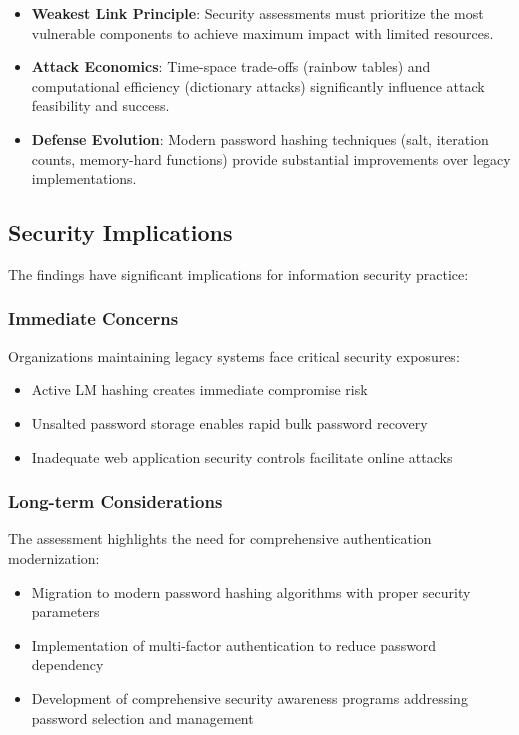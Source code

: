 \begin{itemize}
    \item \textbf{Weakest Link Principle}: Security assessments must prioritize the most vulnerable components to achieve maximum impact with limited resources.

    \item \textbf{Attack Economics}: Time-space trade-offs (rainbow tables) and computational efficiency (dictionary attacks) significantly influence attack feasibility and success.

    \item \textbf{Defense Evolution}: Modern password hashing techniques (salt, iteration counts, memory-hard functions) provide substantial improvements over legacy implementations.
\end{itemize}

\subsection{Security Implications}

The findings have significant implications for information security practice:

\subsubsection{Immediate Concerns}

Organizations maintaining legacy systems face critical security exposures:
\begin{itemize}
    \item Active LM hashing creates immediate compromise risk
    \item Unsalted password storage enables rapid bulk password recovery
    \item Inadequate web application security controls facilitate online attacks
\end{itemize}

\subsubsection{Long-term Considerations}

The assessment highlights the need for comprehensive authentication modernization:
\begin{itemize}
    \item Migration to modern password hashing algorithms with proper security parameters
    \item Implementation of multi-factor authentication to reduce password dependency
    \item Development of comprehensive security awareness programs addressing password selection and management
\end{itemize}

